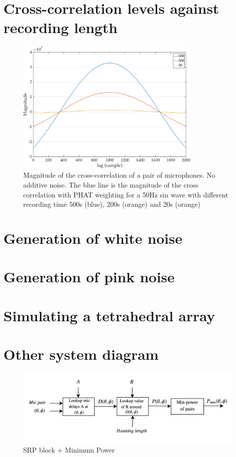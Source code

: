 \section{Cross-correlation levels against recording length}
\begin{figure}[!ht]
    \centering
    \includegraphics[width=0.8\textwidth]{Figures/20200500.png}
    \caption{Magnitude of the cross-correlation of a pair of microphones. No additive noise. The blue line is the magnitude of the cross correlation with PHAT weighting for a 50Hz sin wave with different recording time 500s (blue), 200s (orange) and 20s (orange)}
    \label{fig:xcorr20500hz}
\end{figure}


\section{Generation of white noise}

\section{Generation of pink noise}

\section{Simulating a tetrahedral array}

\section{Other system diagram}
\begin{figure}[H]
    \centering
    \includegraphics[width=1\textwidth]{Figures/system2.png}
    \caption{SRP block + Minimum Power}
    \label{fig:system2}
\end{figure}

